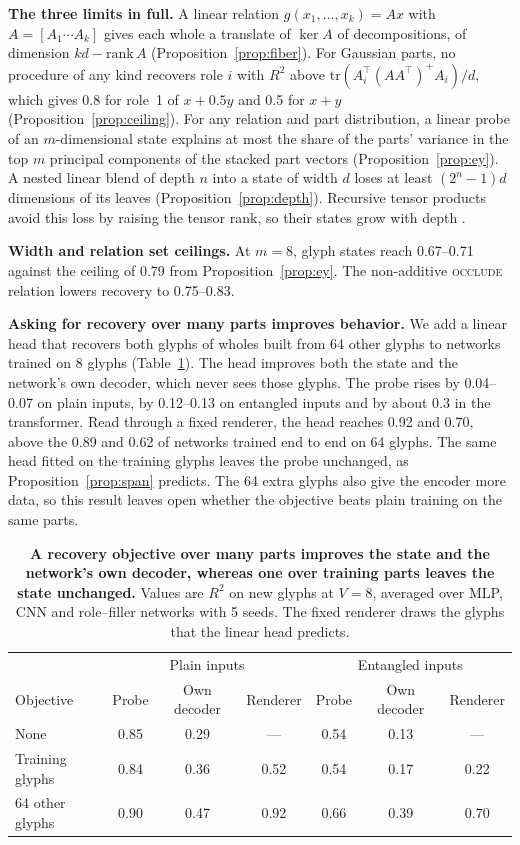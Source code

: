 \documentclass[10pt]{article}
\theoremstyle{plain}
\theoremstyle{remark}
\begin{document}
\textbf{The three limits in full.} A linear relation $g(x_1, \ldots, x_k) = A x$ with $A = [A_1 \cdots A_k]$ gives each whole a translate of $\ker A$ of decompositions, of dimension $kd - \mathrm{rank}\,A$ (Proposition~\ref{prop:fiber}). For Gaussian parts, no procedure of any kind recovers role $i$ with $R^2$ above $\mathrm{tr}(A_i^{\top}(AA^{\top})^{+}A_i)/d$, which gives 0.8 for role~1 of $x + 0.5y$ and 0.5 for $x + y$ (Proposition~\ref{prop:ceiling}). For any relation and part distribution, a linear probe of an $m$-dimensional state explains at most the share of the parts' variance in the top $m$ principal components of the stacked part vectors (Proposition~\ref{prop:ey}). A nested linear blend of depth $n$ into a state of width $d$ loses at least $(2^n - 1)d$ dimensions of its leaves (Proposition~\ref{prop:depth}). Recursive tensor products avoid this loss by raising the tensor rank, so their states grow with depth \citep{smolensky1990}.

\textbf{Width and relation set ceilings.} At $m = 8$, glyph states reach 0.67--0.71 against the ceiling of 0.79 from Proposition~\ref{prop:ey}. The non-additive \textsc{occlude} relation lowers recovery to 0.75--0.83.

\textbf{Asking for recovery over many parts improves behavior.} We add a linear head that recovers both glyphs of wholes built from 64 other glyphs to networks trained on 8 glyphs (Table~\ref{tab:objective}). The head improves both the state and the network's own decoder, which never sees those glyphs. The probe rises by 0.04--0.07 on plain inputs, by 0.12--0.13 on entangled inputs and by about 0.3 in the transformer. Read through a fixed renderer, the head reaches 0.92 and 0.70, above the 0.89 and 0.62 of networks trained end to end on 64 glyphs. The same head fitted on the training glyphs leaves the probe unchanged, as Proposition~\ref{prop:span} predicts. The 64 extra glyphs also give the encoder more data, so this result leaves open whether the objective beats plain training on the same parts.

\begin{table}[h]
  \caption{\textbf{A recovery objective over many parts improves the state and the network's own decoder, whereas one over training parts leaves the state unchanged.} Values are $R^2$ on new glyphs at $V = 8$, averaged over MLP, CNN and role--filler networks with 5 seeds. The fixed renderer draws the glyphs that the linear head predicts.}
  \label{tab:objective}
  \centering\small
  \begin{tabular}{@{}lcccccc@{}}
    \toprule
    & \multicolumn{3}{c}{Plain inputs} & \multicolumn{3}{c}{Entangled inputs} \\
    Objective & Probe & Own decoder & Renderer & Probe & Own decoder & Renderer \\
    \midrule
    None & 0.85 & 0.29 & --- & 0.54 & 0.13 & --- \\
    Training glyphs & 0.84 & 0.36 & 0.52 & 0.54 & 0.17 & 0.22 \\
    64 other glyphs & 0.90 & 0.47 & 0.92 & 0.66 & 0.39 & 0.70 \\
    \bottomrule
  \end{tabular}
\end{table}
\end{document}
